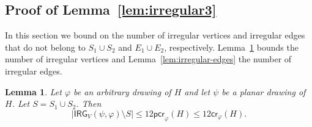 \documentclass[twoside,leqno,twocolumn]{article}
\newtheorem{lemma}{Lemma}
\renewcommand{\phi}{\varphi}
\newcommand{\pcro}{\mathsf{pcr}}
\newcommand{\cro}{\mathsf{cr}}
\newcommand{\irreg}{\mathsf{IRG}}
\begin{document}
\subsection{Proof of Lemma~\ref{lem:irregular3}}\label{subsec:lemma2}
\label{sec:irregular-vertices-edges}


In this section we bound on the number of irregular vertices and irregular edges that do not belong to 
$S_1\cup S_2$ and $E_1\cup E_2$, respectively. Lemma~\ref{lem:irregular-vertices} bounds the number of irregular vertices and Lemma~\ref{lem:irregular-edges} the number of irregular edges.

\begin{lemma}
\label{lem:irregular-vertices}
Let $\phi$ be an arbitrary drawing of $H$ and 
let $\psi$ be a planar drawing of $H$. Let $S = S_1\cup S_2$. Then
\begin{equation}
|\irreg_V(\psi, \phi) \setminus S| \leq 12 \pcro_{\phi}(H) \leq 12 \cro_{\phi}(H). \label{eq:bound-conflicts}
\end{equation}
\end{lemma}
\end{document}
